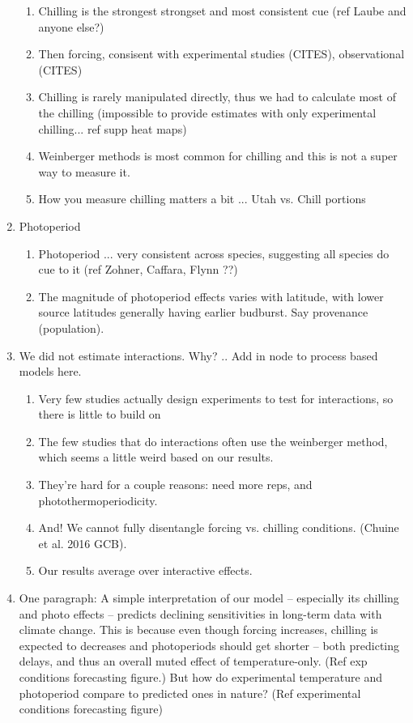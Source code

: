 \documentclass[11pt,letter]{article}
\begin{document}
\begin{enumerate}
\begin{enumerate}
\item Chilling is the strongest strongset and most consistent cue (ref Laube and anyone else?)
\item Then forcing, consisent with experimental studies (CITES), observational (CITES)
\item Chilling is rarely manipulated directly, thus we had to calculate most of the chilling (impossible to provide estimates with only experimental chilling... ref supp heat maps)
\item Weinberger methods is most common for chilling and this is not a super way to measure it.
\item How you measure chilling matters a bit ... Utah vs. Chill portions
\end{enumerate}
\item Photoperiod
\begin{enumerate}
\item Photoperiod ... very consistent across species, suggesting all species do cue to it (ref Zohner, Caffara, Flynn ??)
\item The magnitude of photoperiod effects varies with latitude, with lower source latitudes generally having earlier budburst. Say provenance (population). 
\end{enumerate}
\item We did not estimate interactions. Why? ..  Add in node to process based models here. 
\begin{enumerate}
\item Very few studies actually design experiments to test for interactions, so there is little to build on
\item The few studies that do interactions often use the weinberger method, which seems a little weird based on our results.
\item They're hard for a couple reasons: need more reps, and photothermoperiodicity.
\item And! We cannot fully disentangle forcing vs. chilling conditions. (Chuine et al. 2016 GCB).
\item Our results average over interactive effects. 
\end{enumerate}
\item One paragraph: A simple interpretation of our model -- especially its chilling and photo effects -- predicts declining sensitivities in long-term data with climate change. This is because even though forcing increases, chilling is expected to decreases and photoperiods should get shorter -- both predicting delays, and thus an overall muted effect of temperature-only.  (Ref exp conditions forecasting figure.) But how do experimental temperature and photoperiod compare to predicted ones in nature? (Ref experimental conditions forecasting figure)

\end{enumerate}
\end{document}
